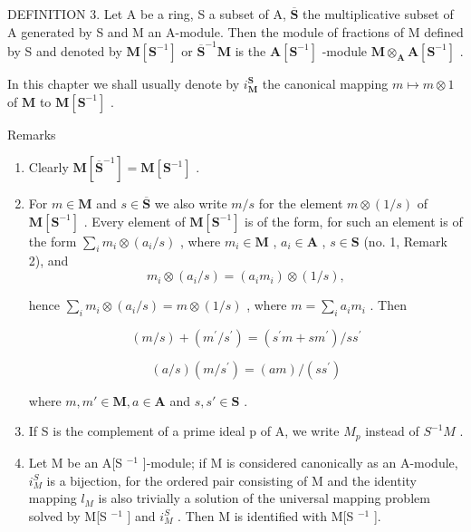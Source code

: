 DEFINITION 3. Let A be a ring, S a subset of A, \(\overline{\mathbf{S}}\) the multiplicative subset of A generated by S and M an A-module. Then the module of fractions of M defined by S and denoted by \(\mathbf{M}[\mathbf{S}^{-1}]\) or \(\overline{\mathbf{S}}^{-1}\mathbf{M}\) is the \(\mathbf{A}[\mathbf{S}^{-1}]\) -module \(\mathbf{M} \otimes_{\mathbf{A}} \mathbf{A}[\mathbf{S}^{-1}]\) .

In this chapter we shall usually denote by \(i_{\mathbf{M}}^{\mathbf{S}}\) the canonical mapping \(m \mapsto m \otimes 1\) of \(\mathbf{M}\) to \(\mathbf{M}[\mathbf{S}^{-1}]\) .

Remarks

\begin{enumerate}
\def\labelenumi{(\arabic{enumi})}
\item
  Clearly \(\mathbf{M}[\overline{\mathbf{S}}^{-1}] = \mathbf{M}[\mathbf{S}^{-1}]\) .
\item
  For \(m \in \mathbf{M}\) and \(s \in \overline{\mathbf{S}}\) we also write \(m / s\) for the element \(m \otimes (1 / s)\) of \(\mathbf{M}[\mathbf{S}^{-1}]\) . Every element of \(\mathbf{M}[\mathbf{S}^{-1}]\) is of the form, for such an element is of the form \(\sum_{i} m_i \otimes (a_i / s)\) , where \(m_i \in \mathbf{M}\) , \(a_i \in \mathbf{A}\) , \(s \in \mathbf{S}\) (no. 1, Remark 2), and
\[
m _ {i} \otimes (a _ {i} / s) = (a _ {i} m _ {i}) \otimes (1 / s),
\]

hence \(\sum_{i} m_{i} \otimes (a_{i}/s) = m \otimes (1/s)\) , where \(m = \sum_{i} a_{i} m_{i}\) . Then


\[
(m / s) + (m ^ {\prime} / s ^ {\prime}) = (s ^ {\prime} m + s m ^ {\prime}) / s s ^ {\prime}\tag{4}
\]

\[
(a / s) (m / s ^ {\prime}) = (a m) / (s s ^ {\prime})\tag{5}
\]

where \(m, m' \in \mathbf{M}, a \in \mathbf{A}\) and \(s, s' \in \mathbf{S}\) .

\item
  If S is the complement of a prime ideal p of A, we write \(M_{p}\) instead of \(S^{-1}M\) .
\item
  Let M be an A{[}S \(^{-1}\) {]}-module; if M is considered canonically as an A-module, \(i_{M}^{S}\) is a bijection, for the ordered pair consisting of M and the identity mapping \(l_{M}\) is also trivially a solution of the universal mapping problem solved by M{[}S \(^{-1}\) {]} and \(i_{M}^{S}\) . Then M is identified with M{[}S \(^{-1}\) {]}.
\end{enumerate}

